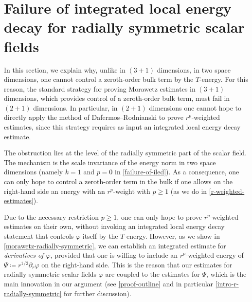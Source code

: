 \documentclass[10pt, reqno]{amsart}
\begin{document}
\section{Failure of integrated local energy decay for radially symmetric scalar fields}
\label{axisymmetric-morawetz-failure} In this section, we explain why, unlike in
\((3 + 1)\) dimensions, in two space dimensions, one cannot control a
zeroth-order bulk term by the \(T\)-energy. For this reason, the standard
strategy for proving Morawetz estimates in \((3 + 1)\) dimensions, which
provides control of a zeroth-order bulk term, must fail in \((2 + 1)\)
dimensions. In particular, in \((2 + 1)\) dimensions one cannot hope to directly
apply the method of Dafermos--Rodnianski \cite{rp-method} to prove
\(r^p\)-weighted estimates, since this strategy requires as input an integrated
local energy decay estimate.

The obstruction lies at the level of the radially symmetric part of the scalar
field. The mechanism is the scale invariance of the energy norm in two space
dimensions (namely \(k=1\) and \(p = 0\) in \cref{failure-of-iled}). As a
consequence, one can only hope to control a zeroth-order term in the bulk if one
allows on the right-hand side an energy with an \(r^p\)-weight with \(p\ge 1\)
(as we do in \cref{r-weighted-estimates}).

Due to the necessary restriction \(p\ge 1\), one can only hope to prove
\(r^p\)-weighted estimates on their own, without invoking an integrated local
energy decay statement that controls \(\varphi{}\) itself by the \(T\)-energy.
However, as we show in \cref{morawetz-radially-symmetric}, we can establish an
integrated estimate for \emph{derivatives of \(\varphi{}\)}, provided that one is
willing to include an \(r^p\)-weighted energy of
\(\Psi{}\coloneqq{}r^{1/2}\partial_r\varphi{}\) on the right-hand side. This is
the reason that our estimates for radially symmetric scalar fields \(\varphi{}\)
are coupled to the estimates for \(\Psi{}\), which is the main innovation in our
argument (see \cref{proof-outline} and in particular \cref{intro-r-radially-symmetric}
for further discussion).
\end{document}
